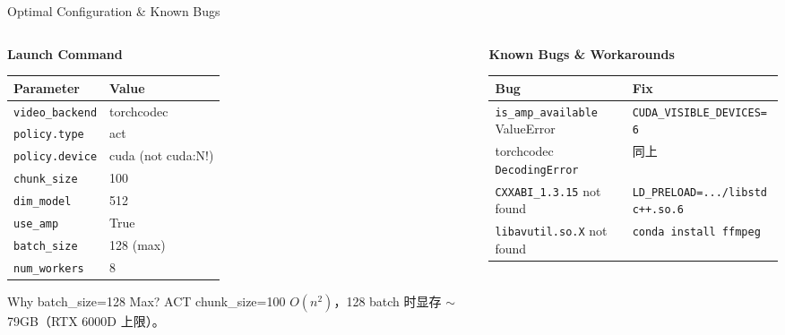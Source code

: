 \documentclass[aspectratio=169, 10pt, xcolor=dvipsnames]{beamer}
\begin{document}
\begin{frame}{Optimal Configuration \& Known Bugs}
\begin{columns}[T]
\begin{column}{0.50\textwidth}
\textbf{Launch Command}

\vspace{0.2em}
\scriptsize
\begin{adjustbox}{max width=\textwidth}
\begin{tabular}{ll}
\toprule
\textbf{Parameter} & \textbf{Value} \\
\midrule
\texttt{video\_backend} & torchcodec \\
\texttt{policy.type}    & act \\
\texttt{policy.device}  & cuda (not cuda:N!) \\
\texttt{chunk\_size}    & 100 \\
\texttt{dim\_model}     & 512 \\
\texttt{use\_amp}       & True \\
\texttt{batch\_size}    & 128 (max) \\
\texttt{num\_workers}   & 8 \\
\bottomrule
\end{tabular}
\end{adjustbox}

\vspace{0.3em}
\begin{alertblock}{\scriptsize Why batch\_size=128 Max?}
\scriptsize ACT chunk\_size=100 $O(n^2)$，128 batch 时显存 ${\sim}$79GB（RTX 6000D 上限）。
\end{alertblock}
\end{column}

\begin{column}{0.47\textwidth}
\textbf{Known Bugs \& Workarounds}

\vspace{0.2em}
\scriptsize
\begin{tabular}{p{2.8cm}p{3.5cm}}
\toprule
\textbf{Bug} & \textbf{Fix} \\
\midrule
\texttt{is\_amp\_available} ValueError & \texttt{CUDA\_VISIBLE\_DEVICES=6} \\
\addlinespace
torchcodec \texttt{DecodingError} & 同上 \\
\addlinespace
\texttt{CXXABI\_1.3.15} not found & \texttt{LD\_PRELOAD=.../libstdc++.so.6} \\
\addlinespace
\texttt{libavutil.so.X} not found & \texttt{conda install ffmpeg} \\
\bottomrule
\end{tabular}
\end{column}
\end{columns}
\end{frame}
\end{document}

